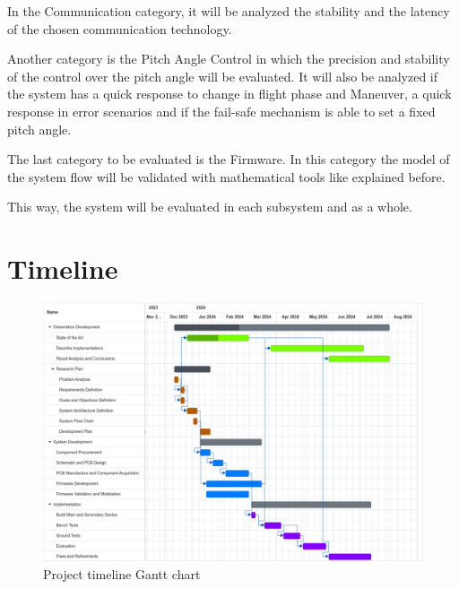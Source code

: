 In the Communication category, it will be analyzed the stability and the latency of the chosen communication technology.

Another category is the Pitch Angle Control in which the precision and stability of the control over the pitch angle will be evaluated.
It will also be analyzed if the system has a quick response to change in flight phase and Maneuver, a quick response in error scenarios and if the fail-safe mechanism is able to set a fixed pitch angle.

The last category to be evaluated is the Firmware.
In this category the model of the system flow will be validated with mathematical tools like explained before.

This way, the system will be evaluated in each subsystem and as a whole.


\section{Timeline}



\begin{figure}[H]
    \centering
    \includegraphics[width=\textwidth,keepaspectratio]{ch5/assets/gantt.pdf}
    \caption{Project timeline Gantt chart}
    \label{gantt}
\end{figure}